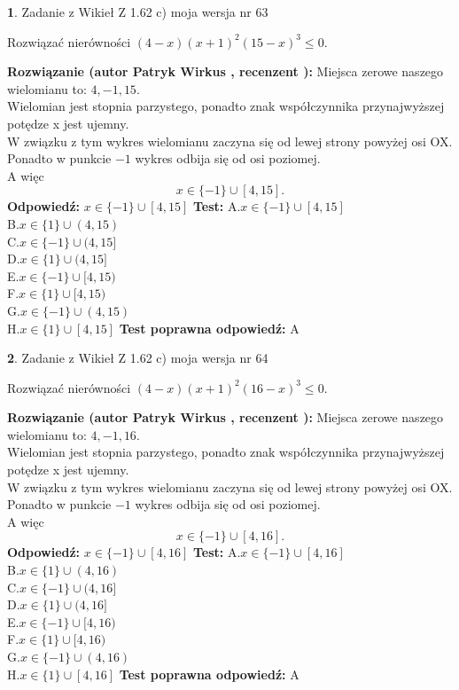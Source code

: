 \documentclass[12pt, a4paper]{article}
\theoremstyle{definition} %
\newtheorem{zad}{}
\newcommand{\zadStart}[1]{\begin{zad}#1\newline}
\newcommand{\zadStop}{\end{zad}}
\newcommand{\rozwStart}[2]{\noindent \textbf{Rozwiązanie (autor #1 , recenzent #2): }\newline}
\newcommand{\rozwStop}{\newline}
\newcommand{\odpStart}{\noindent \textbf{Odpowiedź:}\newline}
\newcommand{\odpStop}{\newline}
\newcommand{\testStart}{\noindent \textbf{Test:}\newline}
\newcommand{\testStop}{\newline}
\newcommand{\kluczStart}{\noindent \textbf{Test poprawna odpowiedź:}\newline}
\newcommand{\kluczStop}{\newline}
\begin{document}
\zadStart{Zadanie z Wikieł Z 1.62 c) moja wersja nr 63}

Rozwiązać nierówności $(4-x)(x+1)^{2}(15-x)^{3}\le0$.
\zadStop
\rozwStart{Patryk Wirkus}{}
Miejsca zerowe naszego wielomianu to: $4, -1, 15$.\\
Wielomian jest stopnia parzystego, ponadto znak współczynnika przy\linebreak najwyższej potędze x jest ujemny.\\ W związku z tym wykres wielomianu zaczyna się od lewej strony powyżej osi OX.\\
Ponadto w punkcie $-1$ wykres odbija się od osi poziomej.\\
A więc $$x \in \{-1\} \cup [4,15].$$
\rozwStop
\odpStart
$x \in \{-1\} \cup [4,15]$
\odpStop
\testStart
A.$x \in \{-1\} \cup [4,15]$\\
B.$x \in \{1\} \cup (4,15)$\\
C.$x \in \{-1\} \cup (4,15]$\\
D.$x \in \{1\} \cup (4,15]$\\
E.$x \in \{-1\} \cup [4,15)$\\
F.$x \in \{1\} \cup [4,15)$\\
G.$x \in \{-1\} \cup (4,15)$\\
H.$x \in \{1\} \cup [4,15]$
\testStop
\kluczStart
A
\kluczStop



\zadStart{Zadanie z Wikieł Z 1.62 c) moja wersja nr 64}

Rozwiązać nierówności $(4-x)(x+1)^{2}(16-x)^{3}\le0$.
\zadStop
\rozwStart{Patryk Wirkus}{}
Miejsca zerowe naszego wielomianu to: $4, -1, 16$.\\
Wielomian jest stopnia parzystego, ponadto znak współczynnika przy\linebreak najwyższej potędze x jest ujemny.\\ W związku z tym wykres wielomianu zaczyna się od lewej strony powyżej osi OX.\\
Ponadto w punkcie $-1$ wykres odbija się od osi poziomej.\\
A więc $$x \in \{-1\} \cup [4,16].$$
\rozwStop
\odpStart
$x \in \{-1\} \cup [4,16]$
\odpStop
\testStart
A.$x \in \{-1\} \cup [4,16]$\\
B.$x \in \{1\} \cup (4,16)$\\
C.$x \in \{-1\} \cup (4,16]$\\
D.$x \in \{1\} \cup (4,16]$\\
E.$x \in \{-1\} \cup [4,16)$\\
F.$x \in \{1\} \cup [4,16)$\\
G.$x \in \{-1\} \cup (4,16)$\\
H.$x \in \{1\} \cup [4,16]$
\testStop
\kluczStart
A
\kluczStop
\end{document}

